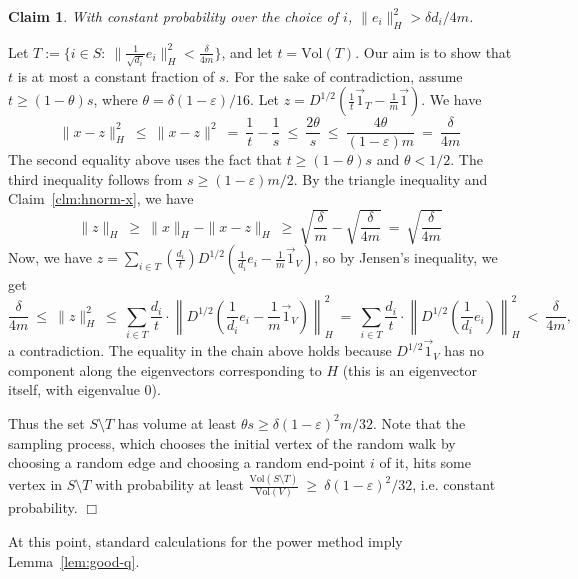 \documentclass[11pt]{article}
\newtheorem{claim}[theorem]{Claim}
\newenvironment{myproof}{\noindent {\sc Proof:}}{$\Box$}
\def\epsilon{\varepsilon}
\def\Dhalf{D^{1/2}}
\def\vol{\text{Vol}}
\begin{document}
\begin{claim} \label{clm:hnorm-e}
With constant probability over the choice of $i$, $\| e_i \|_H^2 > \delta d_i/4m$.
\end{claim}
\begin{myproof} Let $T := \{i \in S:\ \|\frac{1}{\sqrt{d_i}}e_i\|^2_H <
\frac{\delta}{4m}\}$, and let $t = \vol(T)$. Our aim is to show that
$t$ is at most a constant fraction of $s$. For the sake of
contradiction, assume $t \geq (1-\theta)s$,
where $\theta = \delta(1 - \epsilon)/16$. Let $z = \Dhalf(\frac{1}{t}\vec{1}_T - \frac{1}{m}\vec{1})$.
We have
$$\|x - z\|_H^2\ \leq\ \|x - z\|^2\ =\ \frac{1}{t} - \frac{1}{s}\ \leq\
\frac{2\theta}{s}\ \leq\ \frac{4\theta}{(1-\epsilon)m}\ =\
\frac{\delta}{4m}$$
The second equality above uses the fact that $t \geq (1-\theta)s$ and $\theta < 1/2$.
The third inequality follows from $s \geq (1-\epsilon)m/2$.
By the triangle inequality and Claim~\ref{clm:hnorm-x}, we have
$$\|z\|_H\ \geq\ \|x\|_H - \|x - z\|_H\ \geq\ \sqrt{\frac{\delta}{m}} -
\sqrt{\frac{\delta}{4m}}\ =\ \sqrt{\frac{\delta}{4m}}$$
Now, we have $z = \sum_{i \in T} (\frac{d_i}{t})\Dhalf(\frac{1}{d_i}e_i - \frac{1}{m}\vec{1}_V)$,
so by Jensen's inequality, we get
$$\frac{\delta}{4m}\ \leq\ \|z\|_H^2\ \leq\ \sum_{i \in T}\frac{d_i}{t} \cdot
\left\|\Dhalf\left(\frac{1}{d_i}e_i - \frac{1}{m}\vec{1}_V\right)\right\|_H^2\ =\ \sum_{i \in T}\frac{d_i}{t} \cdot
\left\|\Dhalf\left(\frac{1}{d_i}e_i\right)\right\|_H^2\ <\ \frac{\delta}{4m},$$ a contradiction.
The equality in the chain above holds because $\Dhalf \vec{1}_V$ has no component along
the eigenvectors corresponding to $H$ (this is an eigenvector itself,
with eigenvalue $0$).

Thus the set $S \setminus T$ has volume at least $\theta s \geq
\delta(1-\epsilon)^2m/32$. Note that the sampling process, which chooses
the initial vertex of the random walk by choosing a random edge and choosing a
random end-point $i$ of it, hits some vertex in $S \setminus T$ with probability
at least $\frac{\vol(S \setminus T)}{\vol(V)}\ \geq\
\delta(1-\epsilon)^2/32$, i.e. constant probability.
\end{myproof}
\medskip

At this point, standard calculations for the power method imply Lemma~\ref{lem:good-q}. \\
\end{document}
